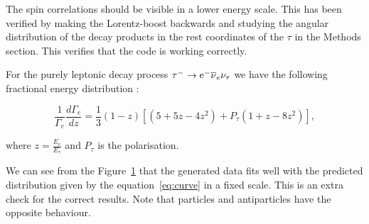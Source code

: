 \documentclass[a4paper,12pt,titlepage]{article}
\begin{document}
The spin correlations should be visible in a lower energy scale. This has been verified by making the Lorentz-boost backwards and studying the angular distribution of the decay products in the rest coordinates of the $\tau$ in the Methods section. This verifies that the code is working correctly.

For the purely leptonic decay process $\tau^- \rightarrow \mbox{$\mathrm{e}^-$} \mbox{$\overline{\nu}_e$} \mbox{$\nu_\tau$}$ we have the following fractional energy distribution \cite{curve}:

\begin{equation}
  \frac{1}{\Gamma_e}\frac{d\Gamma_e}{dz} = \frac{1}{3}(1-z)[(5+5z-4z^2)+P_{\tau}(1+z-8z^2)],
  \label{eq:curve}
\end{equation}

where $z=\frac{E_e}{E_{\tau}}$ and $P_{\tau}$ is the polarisation.

We can see from the Figure~\ref{fig:curves} that the generated data fits well with the predicted distribution given by the equation~\ref{eq:curve} in a fixed scale. This is an extra check for the correct results. Note that particles and antiparticles have the opposite behaviour.

\begin{figure}[htbp]
  \begin{center}
    \leavevmode
     \\

  

\label{fig:curves}

\end{center}
\end{figure}
\end{document}
